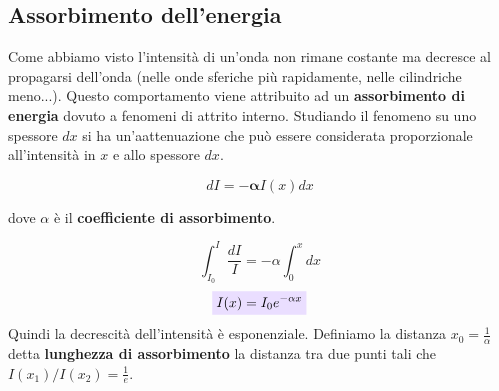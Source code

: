 \documentclass[x11names]{report}
\newcommand{\viola}[1]{\colorbox{yred}{$\displaystyle #1$}}
\begin{document}
%	
%	
%	
%
%
%	
%	
%	
%	
	
	\newpage
	\subsection{Assorbimento dell'energia}
	Come abbiamo visto l'intensità di un'onda non rimane costante ma decresce al propagarsi dell'onda (nelle onde sferiche più rapidamente, nelle cilindriche meno...). Questo comportamento viene attribuito ad un \textbf{assorbimento di energia} dovuto a fenomeni di attrito interno. Studiando il fenomeno su uno spessore \(dx\) si ha un'aattenuazione che può essere considerata proporzionale all'intensità in \(x\) e allo spessore \(dx\).
	
	\[ 
	dI = -\boldsymbol{\alpha} I(x)dx
	\]
	
	dove \(\alpha\) è il \textbf{coefficiente di assorbimento}.
	
	\[ 
	\int_{I_0}^{I} \frac{dI}{I} = -\alpha\int_{0}^{x} dx 
	\]
	\begin{equation}
		\viola{I(x) = I_0e^{-\alpha x}}
	\end{equation}
	Quindi la decrescità dell'intensità è esponenziale. Definiamo la distanza \(x_0 = \frac{1}{\alpha}\) detta \textbf{lunghezza di assorbimento} la distanza tra due punti tali che \(I(x_1)/I(x_2) = \frac{1}{e}\).\\
	
\end{document}
